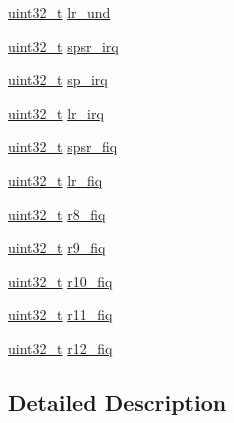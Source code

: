 \begin{DoxyCompactItemize}
\item 
\hyperlink{arch__types_8h_a435d1572bf3f880d55459d9805097f62}{uint32\-\_\-t} \hyperlink{structarch__regs__banked_a9c99745c4b28ca5c46c0aee6a164b089}{lr\-\_\-und}
\item 
\hyperlink{arch__types_8h_a435d1572bf3f880d55459d9805097f62}{uint32\-\_\-t} \hyperlink{structarch__regs__banked_aee1280364392ef11a9db3da9c2a2c5ee}{spsr\-\_\-irq}
\item 
\hyperlink{arch__types_8h_a435d1572bf3f880d55459d9805097f62}{uint32\-\_\-t} \hyperlink{structarch__regs__banked_a995e4155cdaeb7d8dc530a52f531ad7d}{sp\-\_\-irq}
\item 
\hyperlink{arch__types_8h_a435d1572bf3f880d55459d9805097f62}{uint32\-\_\-t} \hyperlink{structarch__regs__banked_a40c4ed1151aa96baf0123e142db7fd5c}{lr\-\_\-irq}
\item 
\hyperlink{arch__types_8h_a435d1572bf3f880d55459d9805097f62}{uint32\-\_\-t} \hyperlink{structarch__regs__banked_a667268175afba21309aaaac957734a43}{spsr\-\_\-fiq}
\item 
\hyperlink{arch__types_8h_a435d1572bf3f880d55459d9805097f62}{uint32\-\_\-t} \hyperlink{structarch__regs__banked_a969afbee21b8eeb5325d9093d42fb085}{lr\-\_\-fiq}
\item 
\hyperlink{arch__types_8h_a435d1572bf3f880d55459d9805097f62}{uint32\-\_\-t} \hyperlink{structarch__regs__banked_ab701f0dbdeace6bb500199d02e3369b3}{r8\-\_\-fiq}
\item 
\hyperlink{arch__types_8h_a435d1572bf3f880d55459d9805097f62}{uint32\-\_\-t} \hyperlink{structarch__regs__banked_a04eb0a04b720eb5fe1ff3a6105d35e3a}{r9\-\_\-fiq}
\item 
\hyperlink{arch__types_8h_a435d1572bf3f880d55459d9805097f62}{uint32\-\_\-t} \hyperlink{structarch__regs__banked_a7667e6ed136285709f1c4d4b7b366d90}{r10\-\_\-fiq}
\item 
\hyperlink{arch__types_8h_a435d1572bf3f880d55459d9805097f62}{uint32\-\_\-t} \hyperlink{structarch__regs__banked_ad746f675f085d70248a5b6209f8f2c1f}{r11\-\_\-fiq}
\item 
\hyperlink{arch__types_8h_a435d1572bf3f880d55459d9805097f62}{uint32\-\_\-t} \hyperlink{structarch__regs__banked_a9b4ae5ee03bbdb881f787bb43620a12a}{r12\-\_\-fiq}
\end{DoxyCompactItemize}


\subsection{\-Detailed \-Description}


